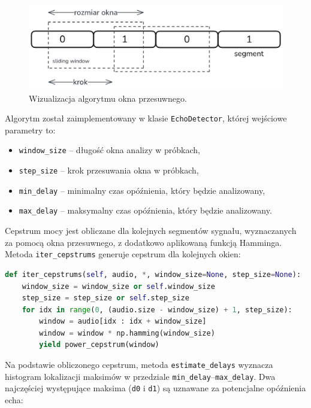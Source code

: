 \begin{figure}[ht!]
	\centering
	\includegraphics[width=\textwidth]{./img/echo-sliding-window.png}
	\caption{\label{fig:sliding} Wizualizacja algorytmu okna przesuwnego.}
\end{figure}
\pagebreak

Algorytm został zaimplementowany w klasie \verb|EchoDetector|, której wejściowe parametry to:
\begin{itemize}
	\item \verb|window_size| -- długość okna analizy w próbkach,
	\item \verb|step_size| -- krok przesuwania okna w próbkach,
	\item \verb|min_delay| -- minimalny czas opóźnienia, który będzie analizowany,
	\item \verb|max_delay| -- maksymalny czas opóźnienia, który będzie analizowany.
\end{itemize}

Cepstrum mocy jest obliczane dla kolejnych segmentów sygnału, wyznaczanych za pomocą okna przesuwnego, z dodatkowo aplikowaną funkcją Hamminga. Metoda \verb|iter_cepstrums| generuje cepstrum dla kolejnych okien:

\begin{lstlisting}[language=Python, caption={Generator liczący cepstrum mocy dla poszczególnych okien przesuwnych.}]
def iter_cepstrums(self, audio, *, window_size=None, step_size=None):
    window_size = window_size or self.window_size
    step_size = step_size or self.step_size
    for idx in range(0, (audio.size - window_size) + 1, step_size):
        window = audio[idx : idx + window_size]
        window = window * np.hamming(window_size)
        yield power_cepstrum(window)
\end{lstlisting}

Na podstawie obliczonego cepstrum, metoda \verb|estimate_delays| wyznacza histogram lokalizacji maksimów w przedziale \verb|min_delay|--\verb|max_delay|. Dwa najczęściej występujące maksima (\verb|d0| i \verb|d1|) są uznawane za potencjalne opóźnienia echa:

